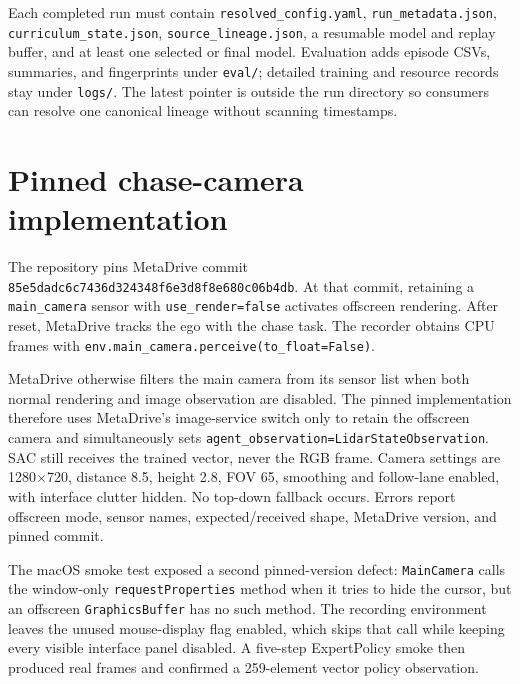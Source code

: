 \documentclass[10pt,twocolumn]{article}
\begin{document}
Each completed run must contain \texttt{resolved\_config.yaml},
\texttt{run\_metadata.json}, \texttt{curriculum\_state.json},
\texttt{source\_lineage.json}, a resumable model and replay buffer, and at least one
selected or final model. Evaluation adds episode CSVs, summaries, and fingerprints under
\texttt{eval/}; detailed training and resource records stay under \texttt{logs/}. The
latest pointer is outside the run directory so consumers can resolve one canonical
lineage without scanning timestamps.

\section{Pinned chase-camera implementation}
The repository pins MetaDrive commit
\texttt{85e5dadc6c7436d324348f6e3d8f8e680c06b4db}. At that commit, retaining a
\texttt{main\_camera} sensor with \texttt{use\_render=false} activates offscreen rendering.
After reset, MetaDrive tracks the ego with the chase task. The recorder obtains CPU frames
with \texttt{env.main\_camera.perceive(to\_float=False)}.

MetaDrive otherwise filters the main camera from its sensor list when both normal
rendering and image observation are disabled. The pinned implementation therefore uses
MetaDrive's image-service switch only to retain the offscreen camera and simultaneously sets
\texttt{agent\_observation=LidarStateObservation}. SAC still receives the trained vector,
never the RGB frame. Camera settings are 1280$\times$720, distance 8.5, height 2.8,
FOV 65, smoothing and follow-lane enabled, with interface clutter hidden. No top-down
fallback occurs. Errors report offscreen mode, sensor names, expected/received shape,
MetaDrive version, and pinned commit.

The macOS smoke test exposed a second pinned-version defect:
\texttt{MainCamera} calls the window-only \texttt{requestProperties} method when it tries
to hide the cursor, but an offscreen \texttt{GraphicsBuffer} has no such method. The
recording environment leaves the unused mouse-display flag enabled, which skips that
call while keeping every visible interface panel disabled. A five-step ExpertPolicy
smoke then produced real frames and confirmed a 259-element vector policy observation.
\end{document}
